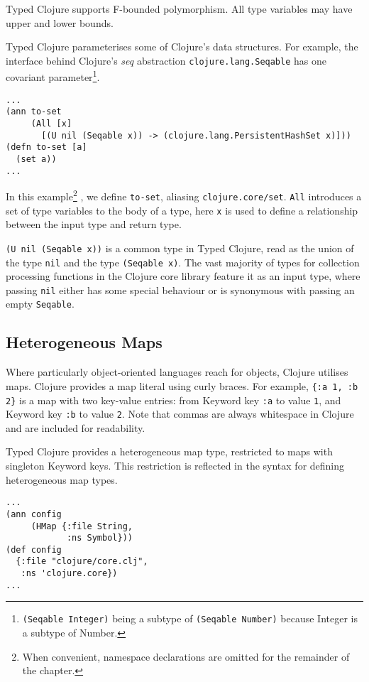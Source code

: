 Typed Clojure supports F-bounded polymorphism. All type variables may have
upper and lower bounds.

Typed Clojure parameterises some of Clojure's data structures. For example,
the interface behind Clojure's \emph{seq} abstraction \lstinline|clojure.lang.Seqable| has one 
covariant parameter\footnote{\lstinline|(Seqable Integer)| being a subtype of \lstinline|(Seqable Number)|
because Integer is a subtype of Number.}.

\begin{lstlisting}
...
(ann to-set 
     (All [x]
       [(U nil (Seqable x)) -> (clojure.lang.PersistentHashSet x)]))
(defn to-set [a]
  (set a))
...
\end{lstlisting}

In this example\footnote{When convenient, namespace declarations are omitted for the remainder of the chapter.}
, we define \lstinline|to-set|, aliasing \lstinline|clojure.core/set|.
\lstinline|All| introduces a set of type variables to the body of a type,
here \lstinline|x| is used to define a relationship between the input type and return type.

\lstinline|(U nil (Seqable x))| is a common type in Typed Clojure, read as the union
of the type \lstinline|nil| and the type \lstinline|(Seqable x)|.
The vast majority of types for collection processing functions in the Clojure core library feature
it as an input type, where passing \lstinline|nil| either has some special behaviour 
or is synonymous with passing an empty \lstinline|Seqable|.

\subsection{Heterogeneous Maps}

Where particularly object-oriented languages reach for objects, Clojure
utilises maps. Clojure provides a map literal using curly braces. For example,
\lstinline|{:a 1, :b 2}| is a map with two key-value entries: from Keyword key \lstinline|:a|
to value \lstinline|1|, and Keyword key \lstinline|:b| to value \lstinline|2|. Note that commas are always
whitespace in Clojure and are included for readability.

Typed Clojure provides a heterogeneous map type, restricted to 
maps with singleton Keyword keys. This restriction is reflected
in the syntax for defining heterogeneous map types.

\begin{lstlisting}
...
(ann config
     (HMap {:file String,
            :ns Symbol}))
(def config
  {:file "clojure/core.clj",
   :ns 'clojure.core})
...
\end{lstlisting}

